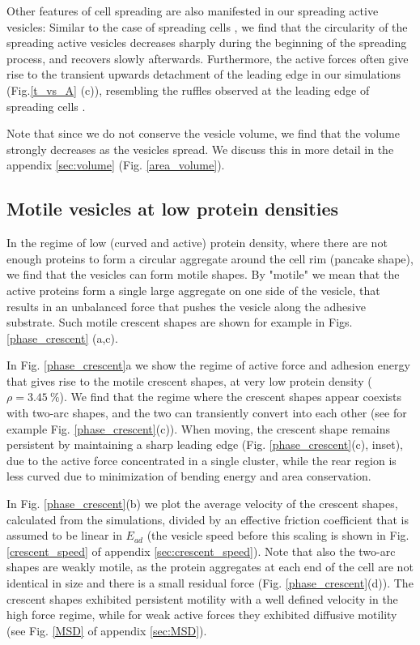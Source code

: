 \documentclass[pre,amsmath]{revtex4}
\begin{document}
Other features of cell spreading are also manifested in our spreading active vesicles: Similar to the case of spreading cells \cite{Sheetz2010}, we find that the circularity of the spreading active vesicles decreases sharply during the beginning of the spreading process, and recovers slowly afterwards.
Furthermore, the active forces often give rise to the transient upwards detachment of the leading edge in our simulations (Fig.\ref{t_vs_A} (c)), resembling the ruffles observed at the leading edge of spreading cells \cite{Sheetz2011,Nils2017,begemann2019mechanochemical,simeonov2019high}.

Note that since we do not conserve the vesicle volume, we find that the volume strongly decreases as the vesicles spread. We discuss this in more detail in the appendix \ref{sec:volume} (Fig. \ref{area_volume}).

\subsection{Motile vesicles at low protein densities}
In the regime of low (curved and active) protein density, where there are not enough proteins to form a circular aggregate around the cell rim (pancake shape), we find that the vesicles can form motile shapes. By "motile" we mean that the active proteins form a single large aggregate on one side of the vesicle, that results in an unbalanced force that pushes the vesicle along the adhesive substrate. Such motile crescent shapes are shown for example in Figs. \ref{phase_crescent} (a,c). 

In Fig. \ref{phase_crescent}a we show the regime of active force and adhesion energy that gives rise to the motile crescent shapes, at very low protein density ($\rho=3.45~\%$). We find that the regime where the crescent shapes appear coexists with two-arc shapes, and the two can transiently convert into each other (see for example Fig. \ref{phase_crescent}(c)). When moving, the crescent shape remains persistent by maintaining a sharp leading edge (Fig. \ref{phase_crescent}(c), inset), due to the active force concentrated in a single cluster, while the rear region is less curved due to minimization of bending energy and area conservation. 

In Fig. \ref{phase_crescent}(b) we plot the average velocity of the crescent shapes, calculated from the simulations, divided by an effective friction coefficient that is assumed to be linear in $E_{ad}$ (the vesicle speed before this scaling is shown in Fig. \ref{crescent_speed} of appendix \ref{sec:crescent_speed}). Note that also the two-arc shapes are weakly motile, as the protein aggregates at each end of the cell are not identical in size and there is a small residual force (Fig. \ref{phase_crescent}(d)). The crescent shapes exhibited persistent motility with a well defined velocity in the high force regime, while for weak active forces they exhibited diffusive motility (see Fig. \ref{MSD} of appendix \ref{sec:MSD}).
\end{document}
